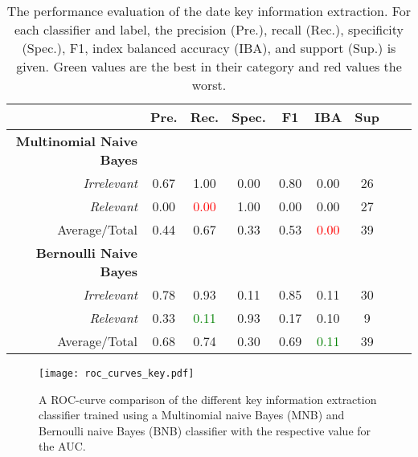  \begin{table}
    \caption{The performance evaluation of the date key information extraction. For each classifier and label, the precision (Pre.), recall (Rec.), specificity (Spec.), F1, index balanced accuracy (IBA), and support (Sup.) is given. Green values are the best in their category and red values the worst.}
    \centering
    \begin{tabular}{@{}rcccccccc@{}}
      \toprule
       & \textbf{Pre.} & \textbf{Rec.} & \textbf{Spec.}
      & \textbf{F1} &  \textbf{IBA}& \textbf{Sup} \\
      \midrule
      \textbf{Multinomial Naive Bayes}\\
      \textsl{Irrelevant}& 0.67& 1.00&  0.00& 0.80& 0.00& 26 \\
      \textsl{Relevant}& 0.00& \textcolor{red}{0.00}&  1.00& 0.00& 0.00& 27 \\
      Average/Total& 0.44& 0.67& 0.33& 0.53& \textcolor{red}{0.00}& 39 \vspace{2mm}\\
      \textbf{Bernoulli Naive Bayes}\\
      \textsl{Irrelevant}& 0.78& 0.93&  0.11& 0.85& 0.11& 30 \\
      \textsl{Relevant}& 0.33& \textcolor{green}{0.11}&  0.93& 0.17& 0.10& 9 \\
      Average/Total& 0.68& 0.74& 0.30& 0.69& \textcolor{green}{0.11}& 39 \vspace{2mm}\\
      \bottomrule
    \end{tabular}
  \label{table:keyword_performance_dates}
  \end{table}

  \begin{figure}
    \centering
    \texttt{[image: roc\_curves\_key.pdf]}
    \caption{A ROC-curve comparison of the different key information extraction classifier trained using a Multinomial naive Bayes (MNB) and Bernoulli naive Bayes (BNB) classifier with the respective value for the AUC.}
  \label{fig:roc_key}
  \end{figure}

